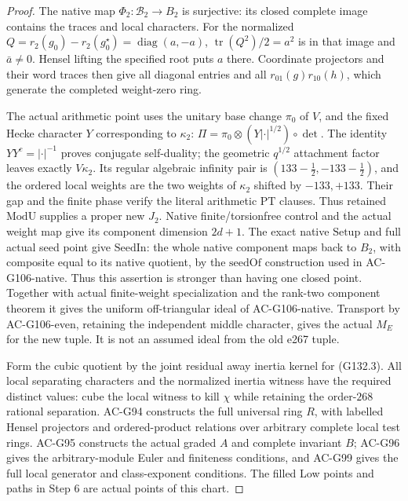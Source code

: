 \begin{proof}
The native map \(\Phi_2:\mathcal B_2\to B_2\) is surjective:
its closed complete image contains the traces and local
characters.  For the normalized
\(Q=r_2(g_0)-r_2(g_0^\star)=\operatorname{diag}(a,-a)\),
\(\operatorname{tr}(Q^2)/2=a^2\) is in that image and
\(\bar a\ne0\).  Hensel lifting the specified root puts \(a\)
there.  Coordinate projectors and their word traces then
give all diagonal entries and all
\(r_{01}(g)r_{10}(h)\), which generate the completed
weight-zero ring.

The actual arithmetic point uses the unitary base change
\(\pi_0\) of \(V\), and the fixed Hecke character \(Y\)
corresponding to \(\kappa_2\):
\(\Pi=\pi_0\otimes(Y|\cdot|^{1/2})\circ\det\).
The identity \(YY^c=|\cdot|^{-1}\) proves conjugate
self-duality; the geometric \(q^{1/2}\) attachment factor
leaves exactly \(V\kappa_2\).
Its regular algebraic infinity pair is
\((133-\tfrac12,-133-\tfrac12)\), and the ordered local
weights are the two weights of \(\kappa_2\) shifted by
\(-133,+133\).  Their gap and the finite phase verify the
literal arithmetic \(\mathrm{PT}\) clauses.
Thus retained \(\mathrm{ModU}\) supplies a proper new \(J_2\).
Native finite/torsionfree control and the actual weight map
give its component dimension \(2d+1\).
The exact native \(\mathrm{Setup}\) and full actual seed point
give \(\mathrm{SeedIn}\): the whole native component maps
back to \(B_2\), with composite equal to its native quotient,
by the \(\mathrm{seedOf}\) construction used in AC-G106-native.
Thus this assertion is stronger than having one closed point.
Together with actual finite-weight specialization and the
rank-two component theorem it gives the uniform
off-triangular ideal of AC-G106-native.
Transport by AC-G106-even, retaining the independent middle
character, gives the actual \(M_E\) for the new tuple.
It is not an assumed ideal from the old e267 tuple.

Form the cubic quotient by the joint residual away inertia
kernel for (G132.3).  All local separating characters and
the normalized inertia witness have the required distinct
values: cube the local witness to kill \(\chi\) while
retaining the order-\(268\) rational separation.
AC-G94 constructs the full universal ring \(R\), with
labelled Hensel projectors and ordered-product relations
over arbitrary complete local test rings.
AC-G95 constructs the actual graded \(A\) and complete
invariant \(B\); AC-G96 gives the arbitrary-module Euler
and finiteness conditions, and AC-G99 gives the full
local generator and class-exponent conditions.
The filled Low points and paths in Step 6 are actual
points of this chart.


\end{proof}
